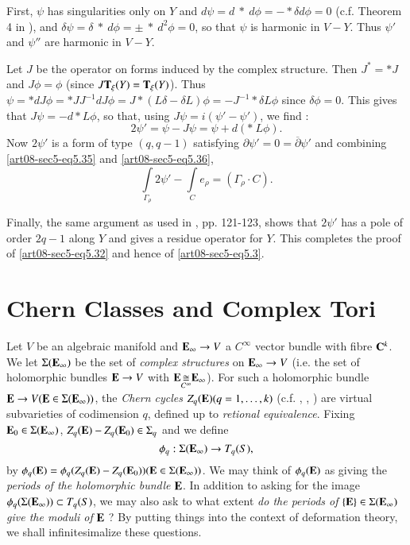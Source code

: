 First, $\psi$ has singularities only on $Y$ and $d\psi=d \ * \ d\phi=-*\delta d\phi=0$ (c.f. Theorem 4 in \cite{art08-key17}), and $\delta\psi=\delta \ * \ d\phi=\pm \ * \ d^{2}\phi=0$, so that $\psi$ is harmonic in $V-Y$. Thus $\psi'$ and $\psi''$ are harmonic in $V-Y$.

Let $J$ be the operator on forms induced by the complex structure. Then $J^{*}=*J$ and $J\phi=\phi$ (since $J\mathbf{T}_{\xi}(Y)=\mathbf{T}_{\xi}(Y)$). Thus $\psi=*dJ\phi=*JJ^{-1}dJ\phi=J*(L\delta-\delta L)\phi=-J^{-1}*\delta L\phi$ since $\delta\phi=0$. This gives that $J\psi=-d*L\phi$, so that, using $J\psi=i(\psi'-\psi')$, we find :
\begin{equation}
2\psi'=\psi-J\psi=\psi+d(* \ L\phi).\label{art08-sec5-eq5.36}
\end{equation}\pageoriginale
Now $2\psi'$ is a form of type $(q,q-1)$ satisfying $\partial \psi'=0=\overline{\partial}\psi'$ and combining \eqref{art08-sec5-eq5.35} and \eqref{art08-sec5-eq5.36},
\begin{equation}
\int\limits_{\Gamma_{\rho}}2\psi'-\int\limits_{C}e_{\rho}=(\Gamma_{\rho}\cdot C).\label{art08-sec5-eq5.37}
\end{equation}

Finally, the same argument as used in \cite{art08-key17}, pp. 121-123, shows that $2\psi'$ has a pole of order $2q-1$ along $Y$ and gives a residue operator for $Y$. This completes the proof of \eqref{art08-sec5-eq5.32} and hence of \eqref{art08-sec5-eq5.3}.

\section{Chern Classes and Complex Tori}\label{art08-sec6}

Let $V$ be an algebraic manifold and $\mathbf{E}_{\infty}\to V$ a $C^{\infty}$ vector bundle with fibre $\mathbf{C}^{k}$. We let $\Sigma(\mathbf{E}_{\infty})$ be the set of {\em complex structures} on $\mathbf{E}_{\infty}\to V$ (i.e. the set of holomorphic bundles $\mathbf{E}\to V$ with $\mathbf{E}\displaystyle{\mathop{\cong}\limits_{C^{\infty}}}\mathbf{E}_{\infty}$). For such a holomorphic bundle $\mathbf{E}\to V(\mathbf{E}\in \Sigma(\mathbf{E}_{\infty}))$, the {\em Chern cycles} $Z_{q}(\mathbf{E})(q=1,\ldots,k)$ (c.f. \cite{art08-key11}, \cite{art08-key12}, \cite{art08-key13}) are virtual subvarieties of codimension $q$, defined up to {\em retional equivalence}. Fixing $\mathbf{E}_{0}\in \Sigma(\mathbf{E}_{\infty})$, $Z_{q}(\mathbf{E})-Z_{q}(\mathbf{E}_{0})\in \Sigma_{q}$ and we define
\setcounter{equation}{0}
\begin{equation}
\phi_{q}:\Sigma(\mathbf{E}_{\infty})\to T_{q}(S),\label{art08-sec6-eq6.1}
\end{equation}
by $\phi_{q}(\mathbf{E})=\phi_{q}(Z_{q}(\mathbf{E})-Z_{q}(\mathbf{E}_{0}))(\mathbf{E}\in \Sigma(\mathbf{E}_{\infty}))$. We may think of $\phi_{q}(\mathbf{E})$ as giving the {\em periods of the holomorphic bundle} $\mathbf{E}$. In addition to asking for the image $\phi_{q}(\Sigma(\mathbf{E}_{\infty}))\subset T_{q}(S)$, we may also ask to what extent {\em do the periods of} $\{\mathbf{E}\}\in \Sigma(\mathbf{E}_{\infty})$ {\em give the moduli of} $\mathbf{E}$ ? By putting things into the context of deformation theory, we shall infinitesimalize these questions.

